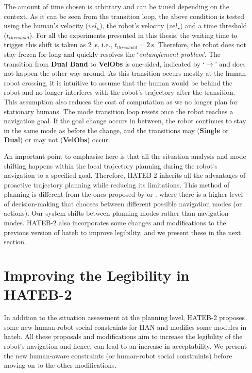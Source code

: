 The amount of time chosen is arbitrary and can be tuned depending on the context. As it can be seen from the transition loop, the above condition is tested using the human's velocity ($vel_h$), the robot's velocity ($vel_r$) and a time threshold ($t_{threshold}$). For all the experiments presented in this thesis, the waiting time to trigger this shift is taken as \SI{2}{\second}, i.e., $t_{threshold} = \SI{2}{\second}$. Therefore, the robot does not stay frozen for long and quickly resolves the `\textit{entanglement problem}'. The transition from \textbf{Dual Band} to \textbf{VelObs} is one-sided, indicated by `$\rightarrow$' and does not happen the other way around. As this transition occurs mostly at the human-robot crossing, it is intuitive to assume that the human would be behind the robot and no longer interferes with the robot's trajectory after the transition. This assumption also reduces the cost of computation as we no longer plan for stationary humans. The mode transition loop resets once the robot reaches a navigation goal. If the goal change occurs in between, the robot continues to stay in the same mode as before the change, and the transitions may (\textbf{Single} or \textbf{Dual}) or may not (\textbf{VelObs}) occur. 

An important point to emphasise here is that all the situation analysis and mode shifting happens within the local trajectory planning during the robot's navigation to a specified goal. Therefore, HATEB-2 inherits all the advantages of proactive trajectory planning while reducing its limitations. This method of planning is different from the ones proposed by \cite{qian2013decision} or \cite{mehta2016autonomous}, where there is a higher level of decision-making that chooses between different possible navigation modes (or actions). Our system shifts between planning modes rather than navigation modes. HATEB-2 also incorporates some changes and modifications to the previous version of \acrshort{hateb} to improve legibility, and we present these in the next section.

 
\section{Improving the Legibility in HATEB-2}\label{improve_legible}
In addition to the situation assessment at the planning level, HATEB-2 proposes some new human-robot social constraints for HAN and modifies some modules in \acrshort{hateb}. All these proposals and modifications aim to increase the legibility of the robot's navigation and hence, can lead to an increase in acceptability. We present the new human-aware constraints (or human-robot social constraints) before moving on to the other modifications.


